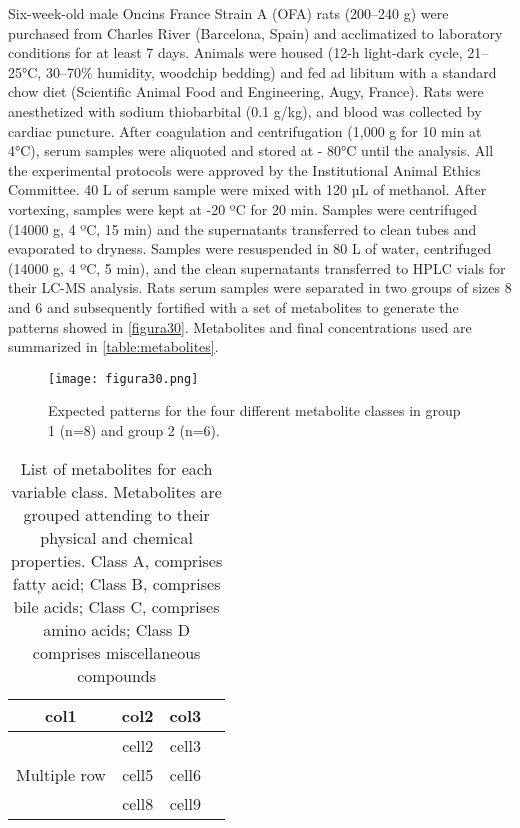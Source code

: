 Six-week-old male Oncins France Strain A (OFA) rats (200–240 g) were purchased from Charles River (Barcelona, Spain) and acclimatized to laboratory conditions for at least 7 days. Animals were housed (12-h light-dark cycle, 21–25°C, 30–70\% humidity, woodchip bedding) and fed ad libitum with a standard chow diet (Scientific Animal Food and Engineering, Augy, France). Rats were anesthetized with sodium thiobarbital (0.1 g/kg), and blood was collected by cardiac puncture. After coagulation and centrifugation (1,000 g for 10 min at 4°C), serum samples were aliquoted and stored at - 80°C until the analysis. All the experimental protocols were approved by the Institutional Animal Ethics Committee. 40 {\textmu}L of serum sample were mixed with 120 µL of methanol. After vortexing, samples were kept at -20 ºC for 20 min. Samples were centrifuged (14000 g, 4 ºC, 15 min) and the supernatants transferred to clean tubes and evaporated to dryness. Samples were resuspended in 80 {\textmu}L of water, centrifuged (14000 g, 4 ºC, 5 min), and the clean supernatants transferred to HPLC vials for their LC-MS analysis. Rats serum samples were separated in two groups of sizes 8 and 6 and subsequently fortified with a set of metabolites to generate the patterns showed in \autoref{figura30}. Metabolites and final concentrations used are summarized in \autoref{table:metabolites}.

\begin{figure}[hbtp]
	\centering
\texttt{[image: figura30.png]}
\caption{Expected patterns for the four different metabolite classes in group 1 (n=8) and group 2 (n=6).}
\label{figura30}
\end{figure}

\begin{table}[h!]
\begin{tabular}{ |c|c|c|c| } 
\hline
col1 & col2 & col3 \\
\hline
\multirow{3}{4em}{Multiple row} & cell2 & cell3 \\ 
& cell5 & cell6 \\ 
& cell8 & cell9 \\ 
\hline
\end{tabular}
\caption{List of metabolites for each variable class. Metabolites are grouped attending to their physical and chemical properties. Class A, comprises fatty acid; Class B, comprises bile acids; Class C, comprises amino acids; Class D comprises miscellaneous compounds}
\label{table:metabolites}
\end{table}

